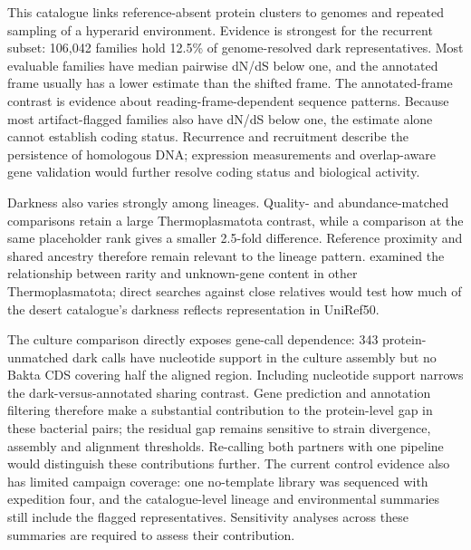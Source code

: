 \documentclass[11pt]{article}
\begin{document}
This catalogue links reference-absent protein clusters to genomes and repeated sampling of a
hyperarid environment. Evidence is strongest for the recurrent subset: 106{,}042 families hold
12.5\% of genome-resolved dark representatives.
Most evaluable families have median pairwise dN/dS below one, and the annotated frame usually
has a lower estimate than the shifted frame. The annotated-frame contrast is evidence about reading-frame-dependent sequence patterns. Because most artifact-flagged families also have dN/dS below one, the estimate alone cannot establish coding status. Recurrence and recruitment describe the
persistence of homologous DNA; expression measurements and overlap-aware gene validation would further resolve coding status and biological activity.

Darkness also varies strongly among lineages. Quality- and abundance-matched comparisons
retain a large Thermoplasmatota contrast, while a comparison at the same placeholder rank gives
a smaller 2.5-fold difference. Reference proximity and shared ancestry therefore remain relevant
to the lineage pattern. \citet{maeke2025thermoplasmatota} examined the relationship between rarity
and unknown-gene content in other Thermoplasmatota; direct searches against close relatives
would test how much of the desert catalogue's darkness reflects representation in UniRef50.

The culture comparison directly exposes gene-call dependence: 343 protein-unmatched dark calls have nucleotide support in the culture assembly but no Bakta CDS covering half the aligned region. Including nucleotide support narrows the dark-versus-annotated sharing contrast. Gene prediction and annotation filtering therefore make a substantial contribution to the protein-level gap in these bacterial pairs; the residual gap remains sensitive to strain divergence, assembly and alignment thresholds. Re-calling both partners with one pipeline would distinguish these contributions further. The current control evidence also has limited campaign
coverage: one no-template library was sequenced with expedition four, and the catalogue-level
lineage and environmental summaries still include the flagged representatives. Sensitivity
analyses across these summaries are required to assess their contribution.
\end{document}
